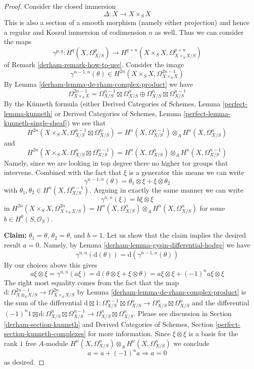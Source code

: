 \begin{proof}
\medskip\noindent
Consider the closed immersion
$$
\Delta : X \to X \times_S X
$$
This is also a section of a smooth morphism (namely either projection)
and hence a regular and Koszul immersion of codimension $n$ as well.
Thus we can consider the maps
$$
\gamma^{p, q} :
H^q(X, \Omega^p_{X/S})
\longrightarrow
H^{q + n}(X \times_S X, \Omega^{p + n}_{X \times_S X/S})
$$
of Remark \ref{derham-remark-how-to-use}. Consider the image
$$
\gamma^{n - 1, n}(\theta) \in
H^{2n}(X \times_S X, \Omega^{2n - 1}_{X \times_S X})
$$
By Lemma \ref{derham-lemma-de-rham-complex-product} we have
$$
\Omega^{2n - 1}_{X \times_S X} =
\Omega^{n - 1}_{X/S} \boxtimes \Omega^n_{X/S} \oplus
\Omega^n_{X/S} \boxtimes \Omega^{n - 1}_{X/S}
$$
By the K\"unneth formula (either
Derived Categories of Schemes, Lemma \ref{perfect-lemma-kunneth} or
Derived Categories of Schemes, Lemma \ref{perfect-lemma-kunneth-single-sheaf})
we see that
$$
H^{2n}(X \times_S X, \Omega^{n - 1}_{X/S} \boxtimes \Omega^n_{X/S}) =
H^n(X, \Omega^{n - 1}_{X/S}) \otimes_A H^n(X, \Omega^n_{X/S})
$$
and
$$
H^{2n}(X \times_S X, \Omega^n_{X/S} \boxtimes \Omega^{n - 1}_{X/S}) =
H^n(X, \Omega^n_{X/S}) \otimes_A H^n(X, \Omega^{n - 1}_{X/S})
$$
Namely, since we are looking in top degree there no higher tor groups
that intervene. Combined with the fact that $\xi$ is a generator this means
we can write
$$
\gamma^{n - 1, n}(\theta) = \theta_1 \otimes \xi + \xi \otimes \theta_2
$$
with $\theta_1, \theta_2 \in H^n(X, \Omega^{n - 1}_{X/S})$.
Arguing in exactly the same manner we can write
$$
\gamma^{n, n}(\xi) = b \xi \otimes \xi
$$
in
$H^{2n}(X \times_S X, \Omega^{2n}_{X \times_S X/S}) =
H^n(X, \Omega^n_{X/S}) \otimes_A H^n(X, \Omega^n_{X/S})$
for some $b \in H^0(S, \mathcal{O}_S)$.

\medskip\noindent
{\bf Claim:} $\theta_1 = \theta$, $\theta_2 = \theta$, and $b = 1$.
Let us show that the claim implies the desired result $a = 0$.
Namely, by Lemma \ref{derham-lemma-gysin-differential-hodge}
we have
$$
\gamma^{n, n}(\text{d}(\theta)) = \text{d}(\gamma^{n - 1, n}(\theta))
$$
By our choices above this gives
$$
a \xi \otimes \xi =
\gamma^{n, n}(a\xi) =
\text{d}(\theta \otimes \xi + \xi \otimes \theta) =
a \xi \otimes \xi + (-1)^n a \xi \otimes \xi
$$
The right most equality comes from the fact that the map
$\text{d} : \Omega^{2n - 1}_{X \otimes_S X/S} \to \Omega^{2n}_{X \times_S X/S}$
by Lemma \ref{derham-lemma-de-rham-complex-product}
is the sum of the differential
$\text{d} \boxtimes 1 : \Omega^{n - 1}_{X/S} \boxtimes \Omega^n_{X/S}
\to \Omega^n_{X/S} \boxtimes \Omega^n_{X/S}$
and the differential
$(-1)^n 1 \boxtimes \text{d} : \Omega^n_{X/S} \boxtimes \Omega^{n - 1}_{X/S}
\to \Omega^n_{X/S} \boxtimes \Omega^n_{X/S}$. Please see discussion in
Section \ref{derham-section-kunneth} and
Derived Categories of Schemes, Section
\ref{perfect-section-kunneth-complexes} for more information.
Since $\xi \otimes \xi$ is a basis for the rank $1$ free $A$-module
$H^n(X, \Omega^n_{X/S}) \otimes_A H^n(X, \Omega^n_{X/S})$
we conclude
$$
a = a + (-1)^n a \Rightarrow a = 0
$$
as desired.


\end{proof}
